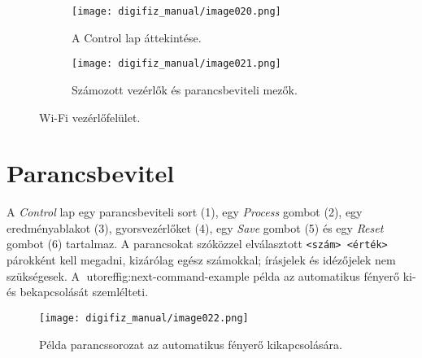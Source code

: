 \begin{figure}[htbp]
    \centering
    \begin{subfigure}{0.48\textwidth}
        \texttt{[image: digifiz\_manual/image020.png]}
        \caption{A Control lap áttekintése.}
    \end{subfigure}\hfill
    \begin{subfigure}{0.48\textwidth}
        \texttt{[image: digifiz\_manual/image021.png]}
        \caption{Számozott vezérlők és parancsbeviteli mezők.}
    \end{subfigure}
    \caption{\ReplicaNextShort{} Wi-Fi vezérlőfelület.}
    \label{fig:next-control-tabs}
\end{figure}

\section{Parancsbevitel}
A \emph{Control} lap egy parancsbeviteli sort (1), egy \emph{Process} gombot (2), egy eredményablakot (3), gyorsvezérlőket (4), egy \emph{Save} gombot (5) és egy \emph{Reset} gombot (6) tartalmaz. A parancsokat szóközzel elválasztott \verb|<szám> <érték>| párokként kell megadni, kizárólag egész számokkal; írásjelek és idézőjelek nem szükségesek. A utoref{fig:next-command-example} példa az automatikus fényerő ki- és bekapcsolását szemlélteti.

\begin{figure}[htbp]
    \centering
    \texttt{[image: digifiz\_manual/image022.png]}
    \caption{Példa parancssorozat az automatikus fényerő kikapcsolására.}
    \label{fig:next-command-example}
\end{figure}

